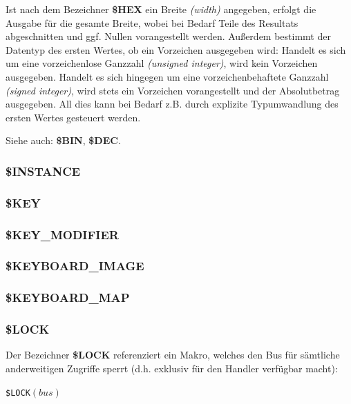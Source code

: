 \documentclass{scrartcl}
\begin{document}
\vspace{10pt}
\noindent Ist nach dem Bezeichner \textbf{\$HEX} ein Breite \textit{(width)} angegeben, erfolgt die Ausgabe für die gesamte Breite, wobei bei Bedarf Teile des Resultats abgeschnitten und ggf. Nullen vorangestellt werden. Außerdem bestimmt der Datentyp des ersten Wertes, ob ein Vorzeichen ausgegeben wird: Handelt es sich um eine vorzeichenlose Ganzzahl \textit{(unsigned integer)}, wird kein Vorzeichen ausgegeben. Handelt es sich hingegen um eine vorzeichenbehaftete Ganzzahl \textit{(signed integer)}, wird stets ein Vorzeichen vorangestellt und der Absolutbetrag ausgegeben. All dies kann bei Bedarf z.B. durch explizite Typumwandlung des ersten Wertes gesteuert werden.

\vspace{10pt}
\noindent Siehe auch: \textbf{\$BIN}, \textbf{\$DEC}.

\subsubsection{\$INSTANCE}

\subsubsection{\$KEY}

\subsubsection{\$KEY\_MODIFIER}

\subsubsection{\$KEYBOARD\_IMAGE}

\subsubsection{\$KEYBOARD\_MAP}

\subsubsection{\$LOCK}

\noindent Der Bezeichner \textbf{\$LOCK} referenziert ein Makro, welches den Bus für sämtliche anderweitigen Zugriffe sperrt (d.h. exklusiv für den Handler verfügbar macht):

\vspace{10pt}
\texttt{\$LOCK$(bus)$}
\end{document}
